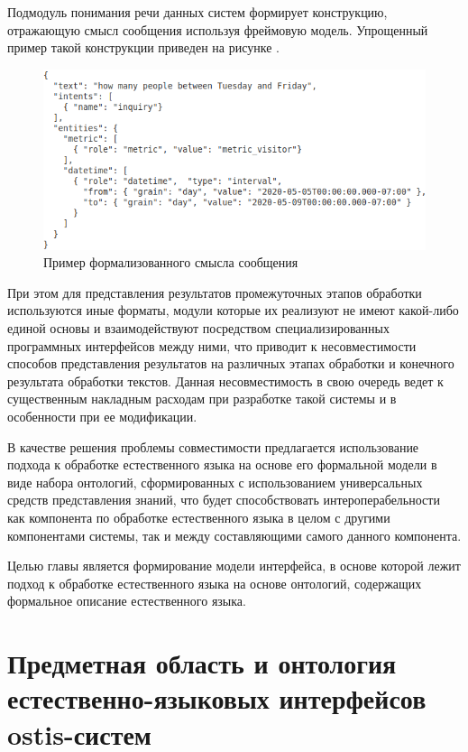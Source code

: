 Подмодуль понимания речи данных систем формирует конструкцию, отражающую смысл сообщения используя фреймовую модель. Упрощенный пример такой конструкции приведен на рисунке \textit{}.

\begin{figure}[h]
    \centerline{\includegraphics[width=\linewidth]{images/part4/chapter_nl_interfaces/message_intents.png}}
    \caption{Пример формализованного смысла сообщения}
    \label{fig:message_intents}
\end{figure}

При этом для представления результатов промежуточных этапов обработки используются иные форматы, модули которые их реализуют не имеют какой-либо единой основы и взаимодействуют посредством специализированных программных интерфейсов между ними, что приводит к несовместимости способов представления результатов на различных этапах обработки и конечного результата обработки текстов. Данная несовместимость в свою очередь ведет к существенным накладным расходам при разработке такой системы и в особенности при ее модификации.

В качестве решения проблемы совместимости предлагается использование подхода к обработке естественного языка на основе его формальной модели в виде набора онтологий, сформированных с использованием универсальных средств представления знаний, что будет способствовать интероперабельности как компонента по обработке естественного языка в целом с другими компонентами системы, так и между составляющими самого данного компонента.

Целью главы является формирование модели интерфейса, в основе которой лежит подход к обработке естественного языка на основе онтологий, содержащих формальное описание естественного языка.

\section{Предметная область и онтология естественно-языковых интерфейсов ostis-систем}

